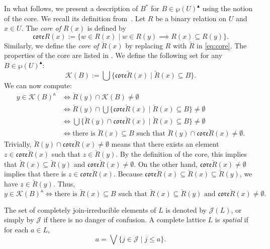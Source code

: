 \documentclass[11pt,a4paper]{amsart}
\newcommand{\UP}{\blacktriangle}
\newcommand{\Up}{\vartriangle}
\theoremstyle{plain}
\theoremstyle{definition}
\theoremstyle{remark}
\numberwithin{equation}{section}
\begin{document}
In what follows, we present a description of $B^*$ for 
$B \in \wp(U)^\UP$ using the notion of the core. We recall its 
definition from~\cite{JarRad25}. Let $R$ be a binary relation on 
$U$ and $x \in U$. The \emph{core of $R(x)$} is defined by 
\begin{equation} \label{eq:core} 
\mathfrak{core}R(x) := 
\{w \in R(x) \mid w \in R(y) \implies R(x) \subseteq R(y) \}. \end{equation} 
Similarly, we define the \emph{core of $\breve{R}(x)$} by replacing 
$R$ with $\breve{R}$ in \eqref{eq:core}. The properties of the 
core are listed in \cite{JarRad25}.
We define the following set for any
$B \in \wp(U)^\UP$:
\[ \mathcal{K}(B) := \bigcup 
\{ \mathfrak{core}\breve{R}(x) \mid \breve{R}(x) 
\subseteq B \} . \]
We can now compute: 
\begin{align*}
y \in \mathcal{K}(B)^\Up & \iff
\breve{R}(y) \cap \mathcal{K}(B) \neq \emptyset  \\
& \iff \breve{R}(y) \cap 
\textstyle{\bigcup} \{ \mathfrak{core}\breve{R}(x) \mid 
\breve{R}(x) \subseteq B \} \neq \emptyset  \\
& \iff \textstyle{\bigcup} \{  \breve{R}(y) \cap  
\mathfrak{core}\breve{R}(x) \mid \breve{R}(x) 
\subseteq B \} \neq \emptyset  \\
& \iff \text{there is } \breve{R}(x) 
\subseteq B \text{ such that }  \breve{R}(y) \cap  
\mathfrak{core}\breve{R}(x) \neq \emptyset.
\end{align*}
Trivially, $\breve{R}(y) \cap \mathfrak{core}\breve{R}(x) \neq \emptyset$ 
means that there exists an element 
$z \in \mathfrak{core}\breve{R}(x) $ such 
that $z \in \breve{R}(y)$. 
By the definition of the core, this implies
that $\breve{R}(x) \subseteq \breve{R}(y)$ and 
$\mathfrak{core}\breve{R}(x) \neq \emptyset$. 
On the other hand, $\mathfrak{core}\breve{R}(x) \neq \emptyset$
implies that there is $z \in \mathfrak{core}\breve{R}(x)$.
Because $\mathfrak{core}\breve{R}(x) \subseteq \breve{R}(x)
\subseteq \breve{R}(y)$, we have $z \in \breve{R}(y)$. Thus,
\[ 
y \in \mathcal{K}(B)^\Up  \iff
\text{there is } \breve{R}(x) 
\subseteq B \text{ such that }  \breve{R}(x) \subseteq \breve{R}(y) 
\text{ and } \mathfrak{core}\breve{R}(x) \neq \emptyset.
\]

The set of completely join-irreducible elements of $L$ is denoted by 
$\mathcal{J}(L)$, or simply by $\mathcal{J}$ if there is no danger of 
confusion.
A complete lattice $L$ is \emph{spatial} if for each $a \in L$,
\[ a = \bigvee \{ j \in \mathcal{J} \mid j \leq a \}. \]
\end{document}
